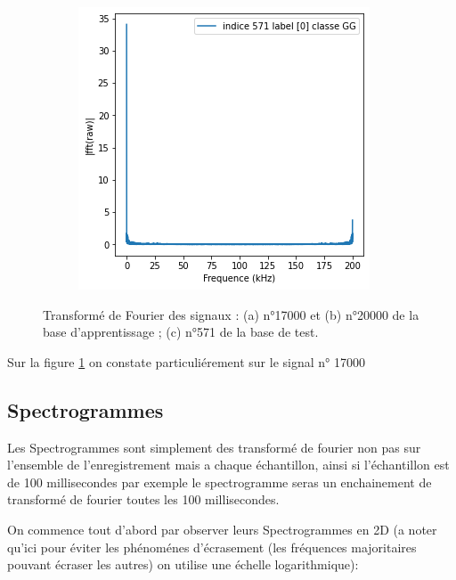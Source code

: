 \begin{figure}[!h]
\begin{subfigure}[b]{0.3\textwidth}
  \end{subfigure}
  \begin{subfigure}[b]{0.3\textwidth}
    \includegraphics[width=\textwidth]{./images/571fft.png}
  \end{subfigure}
  \caption{Transformé de Fourier des signaux : (a) n°17000 et (b) n°20000 de la base d'apprentissage ; (c) n°571 de la base de test.%
\label{fig:tf}}
\end{figure}

Sur la figure \ref{fig:tf} on constate particuliérement sur le signal n° 17000

\hypertarget{Spectrogrammes}{%
\subsection{Spectrogrammes}
\label{Spectrogrammes}}

Les Spectrogrammes sont simplement des transformé de fourier non pas sur l'ensemble de l'enregistrement mais a chaque échantillon, ainsi si l'échantillon est de 100 millisecondes par exemple le spectrogramme seras un enchainement de transformé de fourier toutes les 100 millisecondes.

On commence tout d'abord par observer leurs Spectrogrammes en 2D (a noter qu'ici pour éviter les phénoménes d'écrasement (les fréquences majoritaires pouvant écraser les autres) on utilise une échelle logarithmique):

